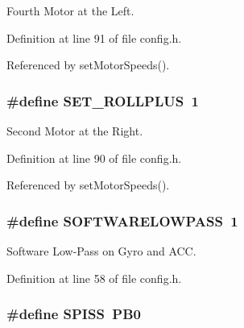 Fourth Motor at the Left. 



Definition at line 91 of file config.\-h.



Referenced by set\-Motor\-Speeds().

\hypertarget{group__config_ga460dbe0039d252579c5ce8beef7cc709}{
\subsubsection[{S\-E\-T\-\_\-\-R\-O\-L\-L\-P\-L\-U\-S}]{\setlength{\rightskip}{0pt plus 5cm}\#define S\-E\-T\-\_\-\-R\-O\-L\-L\-P\-L\-U\-S~1}}\label{group__config_ga460dbe0039d252579c5ce8beef7cc709}


Second Motor at the Right. 



Definition at line 90 of file config.\-h.



Referenced by set\-Motor\-Speeds().

\hypertarget{group__config_gaba06e7be57726e74f267a1622e7d720e}{
\subsubsection[{S\-O\-F\-T\-W\-A\-R\-E\-L\-O\-W\-P\-A\-S\-S}]{\setlength{\rightskip}{0pt plus 5cm}\#define S\-O\-F\-T\-W\-A\-R\-E\-L\-O\-W\-P\-A\-S\-S~1}}\label{group__config_gaba06e7be57726e74f267a1622e7d720e}


Software Low-\/\-Pass on Gyro and A\-C\-C. 



Definition at line 58 of file config.\-h.

\hypertarget{group__config_gab652052c0495e4b720b52cdcf83f535d}{
\subsubsection[{S\-P\-I\-S\-S}]{\setlength{\rightskip}{0pt plus 5cm}\#define S\-P\-I\-S\-S~P\-B0}}\label{group__config_gab652052c0495e4b720b52cdcf83f535d}


